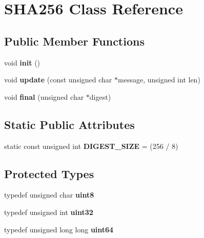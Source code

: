\hypertarget{class_s_h_a256}{}\section{S\+H\+A256 Class Reference}
\label{class_s_h_a256}
\subsection*{Public Member Functions}
\begin{DoxyCompactItemize}
\item 
\mbox{\label{class_s_h_a256_a9893152e0b8a75ebed254509dfb1eb4a}} 
void {\bfseries init} ()
\item 
\mbox{\label{class_s_h_a256_a2ab5f18a14b4493671e7d0c4a636b4c6}} 
void {\bfseries update} (const unsigned char $\ast$message, unsigned int len)
\item 
\mbox{\label{class_s_h_a256_ae28a257b66be069cc850d49dfe3d48f9}} 
void {\bfseries final} (unsigned char $\ast$digest)
\end{DoxyCompactItemize}
\subsection*{Static Public Attributes}
\begin{DoxyCompactItemize}
\item 
\mbox{\label{class_s_h_a256_a62ea97291cac7ce713ac2cf69219851b}} 
static const unsigned int {\bfseries D\+I\+G\+E\+S\+T\+\_\+\+S\+I\+ZE} = (256 / 8)
\end{DoxyCompactItemize}
\subsection*{Protected Types}
\begin{DoxyCompactItemize}
\item 
\mbox{\label{class_s_h_a256_a2d30c8d80b241471affd735f5f5e9925}} 
typedef unsigned char {\bfseries uint8}
\item 
\mbox{\label{class_s_h_a256_a90dbb66f84c4c8c985aaa099a0ef3b54}} 
typedef unsigned int {\bfseries uint32}
\item 
\mbox{\label{class_s_h_a256_a4c998d0c4b147e28438e6b5749cb987e}} 
typedef unsigned long long {\bfseries uint64}
\end{DoxyCompactItemize}
